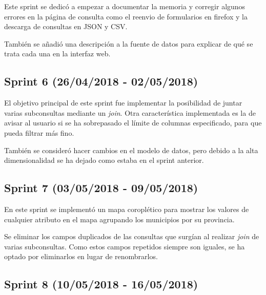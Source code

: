 Este sprint se dedicó a empezar a documentar la memoria y corregir algunos errores en la página de consulta como el reenvio de formularios en firefox y la descarga de consultas en JSON y CSV.

También se añadió una descripción a la fuente de datos para explicar de qué se trata cada una en la interfaz web.



\subsection{Sprint 6 (26/04/2018 - 02/05/2018)}

El objetivo principal de este sprint fue implementar la posibilidad de juntar varias subconsultas mediante un \textit{join}. Otra característica implementada es la de avisar al usuario si se ha sobrepasado el límite de columnas especificado, para que pueda filtrar más fino.

También se consideró hacer cambios en el modelo de datos, pero debido a la alta dimensionalidad se ha dejado como estaba en el sprint anterior.



\subsection{Sprint 7 (03/05/2018 - 09/05/2018)}

En este sprint se implementó un mapa coroplético para mostrar los valores de cualquier atributo en el mapa agrupando los municipios por su provincia.

Se eliminar los campos duplicados de las consultas que surgían al realizar \textit{join} de varias subconsultas. Como estos campos repetidos siempre son iguales, se ha optado por eliminarlos en lugar de renombrarlos.



\subsection{Sprint 8 (10/05/2018 - 16/05/2018)}

